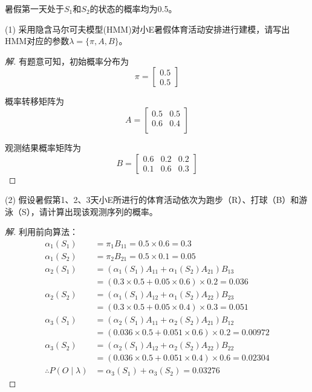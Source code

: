 \documentclass[a4paper]{article}
\begin{document}
\hspace{2em}暑假第一天处于$S_1$和$S_2$的状态的概率均为0.5。

\vspace{3mm}
(1) 采用隐含马尔可夫模型(HMM)对小E暑假体育活动安排进行建模，{\color{blue}请写出HMM对应的参数$\lambda=\{\pi, A, B\}$}。

\begin{proof}[解]
    有题意可知，初始概率分布为
    \[\pi = \begin{bmatrix}
        0.5\\0.5
    \end{bmatrix}\]

    概率转移矩阵为
    \[A = \begin{bmatrix}
        0.5 & 0.5\\
        0.6 & 0.4\\
    \end{bmatrix}\]

    观测结果概率矩阵为
    \[B = \begin{bmatrix}
        0.6 & 0.2 & 0.2\\
        0.1 & 0.6 & 0.3
    \end{bmatrix}\]
\end{proof}

(2) 假设暑假第1、2、3天小E所进行的体育活动依次为跑步（R）、打球（B）和游泳（S），{\color{blue}请计算出现该观测序列的概率}。
\begin{proof}[解]
    利用前向算法：
    \begin{align*}
        \alpha_1(S_1) & = \pi_1 B_{11} = 0.5 \times 0.6 = 0.3\\
        \alpha_1(S_2) & = \pi_2 B_{21} = 0.5 \times 0.1 = 0.05\\
        \alpha_2(S_1) & = (\alpha_1(S_1) A_{11} + \alpha_1(S_2) A_{21}) B_{13}\\
        & = (0.3 \times 0.5 + 0.05 \times 0.6) \times 0.2 = 0.036 \\
        \alpha_2(S_2) & = (\alpha_1(S_1) A_{12} + \alpha_1(S_2) A_{22}) B_{23} \\
        & = (0.3 \times 0.5 + 0.05 \times 0.4) \times 0.3 = 0.051\\
        \alpha_3(S_1) & = (\alpha_2(S_1) A_{11} + \alpha_2(S_2) A_{21}) B_{12} \\
        & = (0.036 \times 0.5 + 0.051 \times 0.6) \times 0.2 = 0.00972\\
        \alpha_3(S_2) & = (\alpha_2(S_1) A_{12} + \alpha_2(S_2) A_{22})B_{22} \\
        & = (0.036 \times 0.5 + 0.051 \times 0.4) \times 0.6 = 0.02304\\
        \therefore P(O \mid \lambda) & = \alpha_3(S_1) + \alpha_3(S_2) = 0.03276
    \end{align*}
\end{proof}
\end{document}
